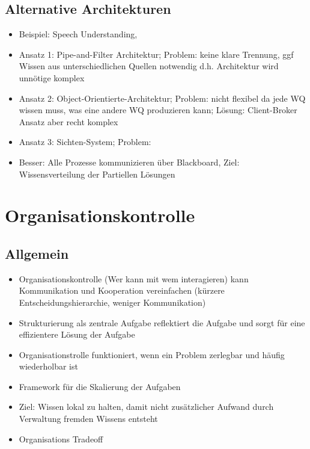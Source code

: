 \documentclass{article} %
\begin{document}
	\subsection{Alternative Architekturen}
	\begin{itemize}
		\item Beispiel: Speech Understanding,
		\item Ansatz 1: Pipe-and-Filter Architektur; Problem: keine klare Trennung, ggf Wissen aus unterschiedlichen Quellen notwendig d.h. Architektur wird unnötige komplex
		\item Ansatz 2: Object-Orientierte-Architektur; Problem: nicht flexibel da jede WQ wissen muss, was eine andere WQ produzieren kann; Lösung: Client-Broker Ansatz aber recht komplex
		\item Ansatz 3: Sichten-System; Problem: 
		\item Besser: Alle Prozesse kommunizieren über Blackboard, Ziel: Wissensverteilung der Partiellen Lösungen
	\end{itemize}
	\section{Organisationskontrolle}
	\subsection{Allgemein}
	\begin{itemize}
		\item Organisationskontrolle (Wer kann mit wem interagieren) kann Kommunikation und Kooperation vereinfachen (kürzere Entscheidungshierarchie, weniger Kommunikation)
		\item Strukturierung als zentrale Aufgabe reflektiert die Aufgabe und sorgt für eine effizientere Lösung der Aufgabe
		\item Organisationstrolle funktioniert, wenn ein Problem zerlegbar und häufig wiederholbar ist
		\item Framework für die Skalierung der Aufgaben
		\item Ziel: Wissen lokal zu halten, damit nicht zusätzlicher Aufwand durch Verwaltung fremden Wissens entsteht
		\item Organisations Tradeoff
	\end{itemize}
\end{document}
